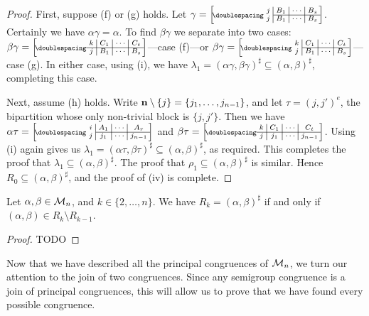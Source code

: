 \begin{lemma}
\begin{proof}
    First, suppose (f) or (g) holds.  Let
    $\gamma = \bipart{c|c|c|c}{2-4}
    {j & B_1 & \cdots & B_s}{j & B_1 & \cdots & B_s}$.  Certainly we have
    $\alpha\gamma = \alpha$.  To find $\beta\gamma$ we separate into two cases:
    $\beta\gamma = \bipart{c|c|c|c}{1-4}
    {k & C_1 & \cdots & C_t}{j & B_1 & \cdots & B_s}$---case (f)---or
    $\beta\gamma = \bipart{c|c|c|c}{2-4}
    {k & C_1 & \cdots & C_t}{j & B_1 & \cdots & B_s}$---case (g).
    In either case, using (i), we have
    $\lambda_1 = (\alpha\gamma, \beta\gamma)^\sharp
    \subseteq (\alpha,\beta)^\sharp$, completing this case.

    Next, assume (h) holds.
    Write $\mathbf{n} \setminus \{j\} = \{j_1, \ldots, j_{n-1}\}$, and let
    $\tau = (j,j')^e$, the bipartition whose only non-trivial block is
    $\{j, j'\}$.  Then we have
    $\alpha\tau = \bipart{c|c|c|c}{2-4}
    {i & A_1 & \cdots & A_r}{j & j_1 & \cdots & j_{n-1}}$ and
    $\beta\tau = \bipart{c|c|c|c}{1-4}
    {k & C_1 & \cdots & C_t}{j & j_1 & \cdots & j_{n-1}}$.
    Using (i) again gives us
    $\lambda_1 = (\alpha\tau, \beta\tau)^\sharp
    \subseteq (\alpha,\beta)^\sharp$,
    as required.  This completes the proof that
    $\lambda_1 \subseteq (\alpha,\beta)^\sharp$.  The proof that
    $\rho_1 \subseteq (\alpha,\beta)^\sharp$ is similar.  Hence $R_0 \subseteq
    (\alpha,\beta)^\sharp$, and the proof of (iv) is complete.
  \end{proof}
\end{lemma}

\begin{lemma}
  \label{lem:rees-genpairs}
  Let $\alpha,\beta \in \mathcal{M}_n$, and $k \in \{2, \ldots, n\}$.  We have
  $R_k = (\alpha, \beta)^\sharp$ if and only if
  $(\alpha, \beta) \in R_k \setminus R_{k-1}$.
  \begin{proof}
    TODO
  \end{proof}
\end{lemma}

Now that we have described all the principal congruences of $\mathcal{M}_n$, we turn
our attention to the join of two congruences.  Since any semigroup congruence is
a join of principal congruences, this will allow us to prove that we have found
every possible congruence.

